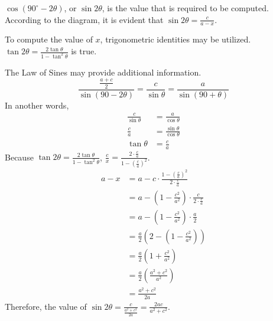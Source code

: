 \documentclass{article}
\begin{document}
$\cos(90^{\circ} - 2\theta)$, or $\sin2\theta$,
is the value that is required to be computed.
According to the diagram, it is evident that
$\sin2\theta = \frac{c}{a - x}$.

To compute the value of $x$, trigonometric
identities may be utilized.
$\tan2\theta = \frac{2\tan\theta}{1 - \tan^2\theta}$
is true.

The Law of Sines may provide additional information.
\[
\frac{\frac{a + c}{2}}{\sin(90 - 2\theta)}
= \frac{c}{\sin\theta} = \frac{a}{\sin(90 + \theta)}
\]
In another words,
\begin{align*}
    \frac{c}{\sin\theta} &= \frac{a}{\cos\theta} \\
    \frac{c}{a} &= \frac{\sin\theta}{\cos\theta} \\
    \tan\theta &= \frac{c}{a}
\end{align*}
Because $\tan2\theta = \frac{2\tan\theta}{1 - \tan^2\theta}$,
$\frac{c}{x} = \frac{2\cdot\frac{c}{a}}{1 - (\frac{c}{a})^2}$.
\begin{align*}
    a - x &= a - c\cdot
        \frac{ 1 - (\frac{c}{a})^2 }{ 2\cdot\frac{c}{a} } \\
    &= a - (1 - \frac{c^2}{a^2}) \cdot
        \frac{c}{ 2 \cdot \frac{c}{a} } \\
    &= a - (1 - \frac{c^2}{a^2}) \cdot \frac{a}{2} \\
    &= \frac{a}{2}
        \left(2 - \left( 1 - \frac{c^2}{a^2} \right) \right) \\
    &= \frac{a}{2} \left(1 + \frac{c^2}{a^2} \right) \\
    &= \frac{a}{2} \left( \frac{a^2 + c^2}{a^2} \right) \\
    &= \frac{a^2 + c^2}{2a}
\end{align*}
Therefore, the value of
$\sin2\theta = \frac{c}{\frac{a^2 + c^2}{2a}}
= \frac{2ac}{a^2 + c^2}$.
\end{document}
